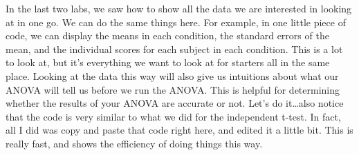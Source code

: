 \documentclass[]{book}
\newenvironment{Shaded}{\begin{snugshade}}{\end{snugshade}}
\newcommand{\KeywordTok}[1]{\textcolor[rgb]{0.13,0.29,0.53}{\textbf{{#1}}}}
\newcommand{\DataTypeTok}[1]{\textcolor[rgb]{0.13,0.29,0.53}{{#1}}}
\newcommand{\DecValTok}[1]{\textcolor[rgb]{0.00,0.00,0.81}{{#1}}}
\newcommand{\StringTok}[1]{\textcolor[rgb]{0.31,0.60,0.02}{{#1}}}
\newcommand{\CommentTok}[1]{\textcolor[rgb]{0.56,0.35,0.01}{\textit{{#1}}}}
\newcommand{\NormalTok}[1]{{#1}}
\theoremstyle{definition}
\theoremstyle{definition}
\theoremstyle{definition}
\theoremstyle{remark}
\begin{document}
In the last two labs, we saw how to show all the data we are interested
in looking at in one go. We can do the same things here. For example, in
one little piece of code, we can display the means in each condition,
the standard errors of the mean, and the individual scores for each
subject in each condition. This is a lot to look at, but it's everything
we want to look at for starters all in the same place. Looking at the
data this way will also give us intuitions about what our ANOVA will
tell us before we run the ANOVA. This is helpful for determining whether
the results of your ANOVA are accurate or not. Let's do it\ldots{}also
notice that the code is very similar to what we did for the independent
t-test. In fact, all I did was copy and paste that code right here, and
edited it a little bit. This is really fast, and shows the efficiency of
doing things this way.

\begin{Shaded}
\end{Shaded}
\end{document}
